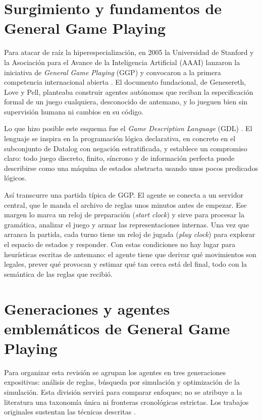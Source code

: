 \section{Surgimiento y fundamentos de General Game Playing}

Para atacar de raíz la hiperespecialización, en 2005 la Universidad de Stanford y la Asociación para el Avance de la Inteligencia Artificial (AAAI) lanzaron la iniciativa de \textit{General Game Playing} (GGP) y convocaron a la primera competencia internacional abierta \cite{Genesereth2005GGP}. El documento fundacional, de Genesereth, Love y Pell, planteaba construir agentes autónomos que reciban la especificación formal de un juego cualquiera, desconocido de antemano, y lo jueguen bien sin supervisión humana ni cambios en su código.

Lo que hizo posible este esquema fue el \textit{Game Description Language} (GDL) \cite{Love2008GDL, GeneserethThielscher2014}. El lenguaje se inspira en la programación lógica declarativa, en concreto en el subconjunto de Datalog con negación estratificada, y establece un compromiso claro: todo juego discreto, finito, síncrono y de información perfecta puede describirse como una máquina de estados abstracta usando unos pocos predicados lógicos.

Así transcurre una partida típica de GGP. El agente se conecta a un servidor central, que le manda el archivo de reglas unos minutos antes de empezar. Ese margen lo marca un reloj de preparación (\textit{start clock}) y sirve para procesar la gramática, analizar el juego y armar las representaciones internas. Una vez que arranca la partida, cada turno tiene un reloj de jugada (\textit{play clock}) para explorar el espacio de estados y responder. Con estas condiciones no hay lugar para heurísticas escritas de antemano: el agente tiene que derivar qué movimientos son legales, prever qué provocan y estimar qué tan cerca está del final, todo con la semántica de las reglas que recibió.

\section{Generaciones y agentes emblemáticos de General Game Playing}

Para organizar esta revisión se agrupan los agentes en tres generaciones expositivas: análisis de reglas, búsqueda por simulación y optimización de la simulación. Esta división servirá para comparar enfoques; no se atribuye a la literatura una taxonomía única ni fronteras cronológicas estrictas. Los trabajos originales sustentan las técnicas descritas \cite{Clune2007ClunePlayer, Schiffel2007Fluxplayer, Finnsson2008CadiaPlayer, Finnsson2012Simulation}.

